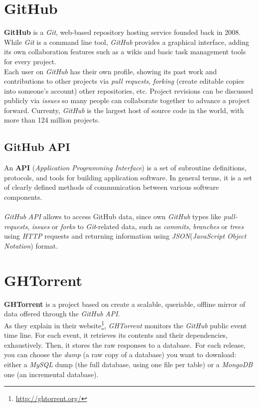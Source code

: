 \documentclass[a4paper, 12pt]{book}
\begin{document}
\section{GitHub}
\label{sec:github}
\textbf{GitHub} is a \emph{Git}, web-based repository hosting service founded back in 2008. While \emph{Git} is a command
line tool, \emph{GitHub} provides a graphical interface, adding its own collaboration features such as a wikis and basic task
management tools for every project.\\
Each user on \emph{GitHub} has their own profile, showing its past work and contributions to
other projects via \textit{pull requests}, \textit{forking} (create editable copies into someone's account) other repositories, etc.
Project revisions can be discussed publicly via \textit{issues} so many people can collaborate together to advance a project
forward. Currenty, \emph{GitHub} is the largest host of source code in the world,
with more than 124 million projects.
\subsection{GitHub API}
\label{ssec:sec_gh-api}
An \textbf{API} (\textit{Application Programming Interface}) is a set of subroutine definitions, protocols, and tools for building
application software. In general terms, it is a set of clearly defined methods of communication between various software components.\\\\
\emph{GitHub} \textit{API} allows to access GitHub data, since own \emph{GitHub} types like \textit{pull-requests}, \textit{issues} or \textit{forks}
to \emph{Git}-related data, such as \textit{commits}, \textit{branches} or \textit{trees} using \textit{HTTP} requests and
returning information using \emph{JSON}(\textit{JavaScript Object Notation}) format.
\section{GHTorrent}
\label{sec:ghtorrent}
\textbf{GHTorrent} is a project based on create a scalable, queriable, offline mirror of data offered through the \emph{GitHub} \textit{API}.\\
As they explain in their website\footnote{\url{http://ghtorrent.org/}}, \emph{GHTorrent} monitors the \emph{GitHub} public event time line.
For each event, it retrieves its contents and their dependencies, exhaustively. Then, it stores the raw responses to a database.\
For each release, you can choose the \textit{dump} (a raw copy of a database) you want to download: either a \emph{MySQL} dump
(the full database, using one file per table) or a \emph{MongoDB} one (an incremental database).\\
\end{document}
